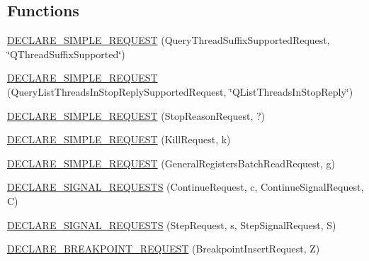 \subsection*{Functions}
\begin{DoxyCompactItemize}
\item 
\mbox{\hyperlink{namespacexd_1_1dbg_1_1gdbstub_1_1pkt_a948bf064167d7fe5a1e046b07e62c2c3}{D\+E\+C\+L\+A\+R\+E\+\_\+\+S\+I\+M\+P\+L\+E\+\_\+\+R\+E\+Q\+U\+E\+ST}} (Query\+Thread\+Suffix\+Supported\+Request, \char`\"{}Q\+Thread\+Suffix\+Supported\char`\"{})
\item 
\mbox{\hyperlink{namespacexd_1_1dbg_1_1gdbstub_1_1pkt_a557fffad3e80bab40dd14e7526657887}{D\+E\+C\+L\+A\+R\+E\+\_\+\+S\+I\+M\+P\+L\+E\+\_\+\+R\+E\+Q\+U\+E\+ST}} (Query\+List\+Threads\+In\+Stop\+Reply\+Supported\+Request, \char`\"{}Q\+List\+Threads\+In\+Stop\+Reply\char`\"{})
\item 
\mbox{\hyperlink{namespacexd_1_1dbg_1_1gdbstub_1_1pkt_a78f1de2e65aef9d111eaf946fbf88e32}{D\+E\+C\+L\+A\+R\+E\+\_\+\+S\+I\+M\+P\+L\+E\+\_\+\+R\+E\+Q\+U\+E\+ST}} (Stop\+Reason\+Request, \textquotesingle{}?\textquotesingle{})
\item 
\mbox{\hyperlink{namespacexd_1_1dbg_1_1gdbstub_1_1pkt_a578456622ed4906c2bbc1e57ce5077f9}{D\+E\+C\+L\+A\+R\+E\+\_\+\+S\+I\+M\+P\+L\+E\+\_\+\+R\+E\+Q\+U\+E\+ST}} (Kill\+Request, \textquotesingle{}k\textquotesingle{})
\item 
\mbox{\hyperlink{namespacexd_1_1dbg_1_1gdbstub_1_1pkt_ac0ac32b52e027d6370b1bc3cadc767a3}{D\+E\+C\+L\+A\+R\+E\+\_\+\+S\+I\+M\+P\+L\+E\+\_\+\+R\+E\+Q\+U\+E\+ST}} (General\+Registers\+Batch\+Read\+Request, \textquotesingle{}g\textquotesingle{})
\item 
\mbox{\hyperlink{namespacexd_1_1dbg_1_1gdbstub_1_1pkt_a0100e422185e866c37a69972d528bbb0}{D\+E\+C\+L\+A\+R\+E\+\_\+\+S\+I\+G\+N\+A\+L\+\_\+\+R\+E\+Q\+U\+E\+S\+TS}} (Continue\+Request, \textquotesingle{}c\textquotesingle{}, Continue\+Signal\+Request, \textquotesingle{}C\textquotesingle{})
\item 
\mbox{\hyperlink{namespacexd_1_1dbg_1_1gdbstub_1_1pkt_a873b9bd00f7d5fd6042ca77210ab4275}{D\+E\+C\+L\+A\+R\+E\+\_\+\+S\+I\+G\+N\+A\+L\+\_\+\+R\+E\+Q\+U\+E\+S\+TS}} (Step\+Request, \textquotesingle{}s\textquotesingle{}, Step\+Signal\+Request, \textquotesingle{}S\textquotesingle{})
\item 
\mbox{\hyperlink{namespacexd_1_1dbg_1_1gdbstub_1_1pkt_a505136d05455c78258fbad83541e8600}{D\+E\+C\+L\+A\+R\+E\+\_\+\+B\+R\+E\+A\+K\+P\+O\+I\+N\+T\+\_\+\+R\+E\+Q\+U\+E\+ST}} (Breakpoint\+Insert\+Request, \textquotesingle{}Z\textquotesingle{})

\end{DoxyCompactItemize}
